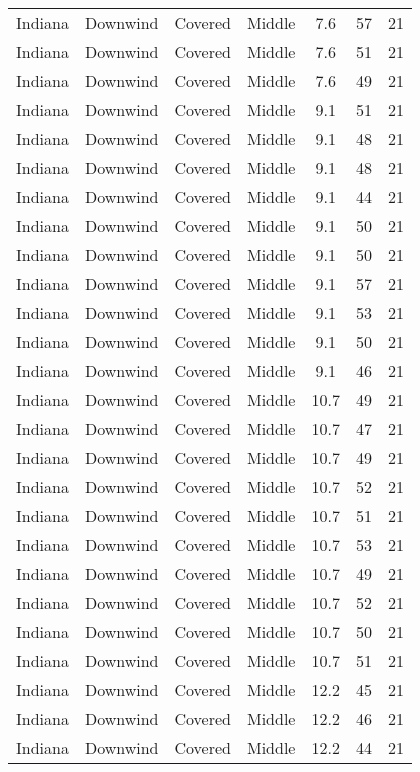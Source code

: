 \documentclass{article}
\begin{document}
\begin{longtable}[H]{ccccccc}
Indiana & Downwind & Covered     & Middle & 7.6  & 57 & 21 \\
Indiana & Downwind & Covered     & Middle & 7.6  & 51 & 21 \\
Indiana & Downwind & Covered     & Middle & 7.6  & 49 & 21 \\
Indiana & Downwind & Covered     & Middle & 9.1  & 51 & 21 \\
Indiana & Downwind & Covered     & Middle & 9.1  & 48 & 21 \\
Indiana & Downwind & Covered     & Middle & 9.1  & 48 & 21 \\
Indiana & Downwind & Covered     & Middle & 9.1  & 44 & 21 \\
Indiana & Downwind & Covered     & Middle & 9.1  & 50 & 21 \\
Indiana & Downwind & Covered     & Middle & 9.1  & 50 & 21 \\
Indiana & Downwind & Covered     & Middle & 9.1  & 57 & 21 \\
Indiana & Downwind & Covered     & Middle & 9.1  & 53 & 21 \\
Indiana & Downwind & Covered     & Middle & 9.1  & 50 & 21 \\
Indiana & Downwind & Covered     & Middle & 9.1  & 46 & 21 \\
Indiana & Downwind & Covered     & Middle & 10.7 & 49 & 21 \\
Indiana & Downwind & Covered     & Middle & 10.7 & 47 & 21 \\
Indiana & Downwind & Covered     & Middle & 10.7 & 49 & 21 \\
Indiana & Downwind & Covered     & Middle & 10.7 & 52 & 21 \\
Indiana & Downwind & Covered     & Middle & 10.7 & 51 & 21 \\
Indiana & Downwind & Covered     & Middle & 10.7 & 53 & 21 \\
Indiana & Downwind & Covered     & Middle & 10.7 & 49 & 21 \\
Indiana & Downwind & Covered     & Middle & 10.7 & 52 & 21 \\
Indiana & Downwind & Covered     & Middle & 10.7 & 50 & 21 \\
Indiana & Downwind & Covered     & Middle & 10.7 & 51 & 21 \\
Indiana & Downwind & Covered     & Middle & 12.2 & 45 & 21 \\
Indiana & Downwind & Covered     & Middle & 12.2 & 46 & 21 \\
Indiana & Downwind & Covered     & Middle & 12.2 & 44 & 21 \\

\end{longtable}
\end{document}
